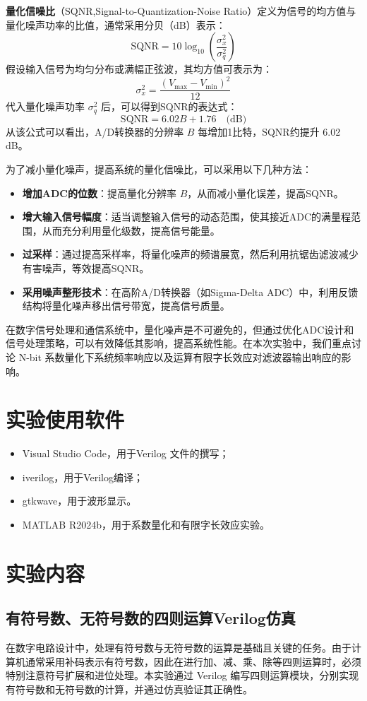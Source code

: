 \documentclass[lang=cn,newtx,10pt,scheme=chinese]{elegantbook}
\begin{document}
\textbf{量化信噪比}（SQNR,Signal-to-Quantization-Noise Ratio）定义为信号的均方值与量化噪声功率的比值，通常采用分贝（dB）表示：
\[
\text{SQNR} = 10 \log_{10} \left( \frac{\sigma_x^2}{\sigma_q^2} \right)
\]
假设输入信号为均匀分布或满幅正弦波，其均方值可表示为：
\[
\sigma_x^2 = \frac{(V_{\max} - V_{\min})^2}{12}
\]
代入量化噪声功率 \(\sigma_q^2\) 后，可以得到SQNR的表达式：
\[
\text{SQNR} = 6.02B + 1.76 \quad \text{(dB)}
\]
从该公式可以看出，A/D转换器的分辨率 \( B \) 每增加1比特，SQNR约提升 6.02 dB。

为了减小量化噪声，提高系统的量化信噪比，可以采用以下几种方法：
\begin{itemize}
    \item \textbf{增加ADC的位数}：提高量化分辨率 \( B \)，从而减小量化误差，提高SQNR。
    \item \textbf{增大输入信号幅度}：适当调整输入信号的动态范围，使其接近ADC的满量程范围，从而充分利用量化级数，提高信号能量。
    \item \textbf{过采样}：通过提高采样率，将量化噪声的频谱展宽，然后利用抗锯齿滤波减少有害噪声，等效提高SQNR。
    \item \textbf{采用噪声整形技术}：在高阶A/D转换器（如Sigma-Delta ADC）中，利用反馈结构将量化噪声移出信号带宽，提高信号质量。
\end{itemize}

在数字信号处理和通信系统中，量化噪声是不可避免的，但通过优化ADC设计和信号处理策略，可以有效降低其影响，提高系统性能。在本次实验中，我们重点讨论 N-bit 系数量化下系统频率响应以及运算有限字长效应对滤波器输出响应的影响。

\section{实验使用软件}
\begin{itemize}
  \item Visual Studio Code，用于Verilog 文件的撰写；
  \item iverilog，用于Verilog编译；
  \item gtkwave，用于波形显示。
  \item MATLAB R2024b，用于系数量化和有限字长效应实验。
\end{itemize}
\section{实验内容}
\subsection{有符号数、无符号数的四则运算Verilog仿真}
在数字电路设计中，处理有符号数与无符号数的运算是基础且关键的任务。由于计算机通常采用补码表示有符号数，因此在进行加、减、乘、除等四则运算时，必须特别注意符号扩展和进位处理。本实验通过 Verilog 编写四则运算模块，分别实现有符号数和无符号数的计算，并通过仿真验证其正确性。
\end{document}
